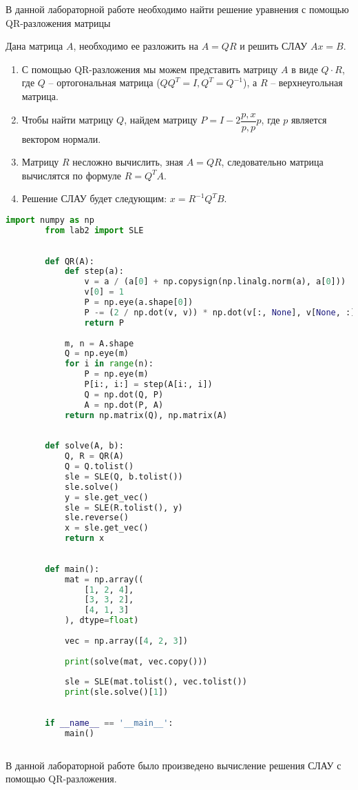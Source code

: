 \documentclass[14pt, a4paper, fleqn]{extarticle}
\begin{document}
	\tableofcontents
	\pagebreak
	В данной лабораторной работе необходимо найти решение уравнения с помощью QR-разложения матрицы
	
	Дана матрица $A$, необходимо ее разложить на $A = QR$ и решить СЛАУ $Ax = B$.
	
	\begin{enumerate}
		\item С помощью QR-разложения мы можем представить матрицу $A$ в виде $Q \cdot R$, где $Q$ -- ортогональная матрица ($QQ^T = I, Q^T = Q^{-1}$), а $R$ -- верхнеугольная матрица.
		\item Чтобы найти матрицу $Q$, найдем матрицу $P = I - 2\dfrac{p, x}{p, p}p$, где $p$ является вектором нормали.
		\item Матрицу $R$ несложно вычислить, зная $A = QR$, следовательно матрица вычислятся по формуле $R = Q^TA$.
		\item Решение СЛАУ будет следующим: $x = R^{-1}Q^TB$.	 	
	\end{enumerate}
	\begin{lstlisting}[language=Python, caption={Компьютерная реализация алгоритма}]
		import numpy as np
		from lab2 import SLE
		
		
		def QR(A):
			def step(a):
				v = a / (a[0] + np.copysign(np.linalg.norm(a), a[0]))
				v[0] = 1
				P = np.eye(a.shape[0])
				P -= (2 / np.dot(v, v)) * np.dot(v[:, None], v[None, :])
				return P
		
			m, n = A.shape
			Q = np.eye(m)
			for i in range(n):
				P = np.eye(m)
				P[i:, i:] = step(A[i:, i])
				Q = np.dot(Q, P)
				A = np.dot(P, A)
			return np.matrix(Q), np.matrix(A)
		
		
		def solve(A, b):
			Q, R = QR(A)
			Q = Q.tolist()
			sle = SLE(Q, b.tolist())
			sle.solve()
			y = sle.get_vec()
			sle = SLE(R.tolist(), y)
			sle.reverse()
			x = sle.get_vec()
			return x
		
		
		def main():
			mat = np.array((
				[1, 2, 4],
				[3, 3, 2],
				[4, 1, 3]
			), dtype=float)
		
			vec = np.array([4, 2, 3])
		
			print(solve(mat, vec.copy()))
		
			sle = SLE(mat.tolist(), vec.tolist())
			print(sle.solve()[1])
		
		
		if __name__ == '__main__':
			main()
		
	\end{lstlisting}
	В данной лабораторной работе было произведено вычисление решения СЛАУ с помощью QR-разложения.
\end{document}
